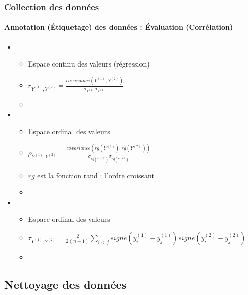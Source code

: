 \documentclass[xcolor=table]{beamer}
\begin{document}
\begin{frame}
	\frametitle{Collection des données}
	\framesubtitle{Annotation (Étiquetage) des données : Évaluation (Corrélation)}
	
	\begin{itemize}
		\item {}
		\begin{itemize}
			\item Espace continu des valeurs (régression)
			\item $r_{Y^{(1)},Y^{(2)}} = \frac{covariance(Y^{(1)},Y^{(2)})}{\sigma_{Y^{(1)}} \sigma_{Y^{(2)}}}$
			\item {}
		\end{itemize}
		\item {}
		\begin{itemize}
			\item Espace ordinal des valeurs
			\item $\rho_{Y^{(1)},Y^{(2)}} = \frac{covariance(rg(Y^{(1)}),rg(Y^{(2)}))}{\sigma_{rg(Y^{(1)})} \sigma_{rg(Y^{(2)})}}$
			\item $rg$ est la fonction rand ; l'ordre croissant
			\item {}
		\end{itemize}
		\item {}
		\begin{itemize}
			\item Espace ordinal des valeurs
			\item $\tau_{Y^{(1)},Y^{(2)}} = \frac{2}{2 (n-1)} \sum_{i<j} signe(y^{(1)}_i - y^{(1)}_j) signe(y^{(2)}_i - y^{(2)}_j)$
			\item {}
		\end{itemize}
	\end{itemize}
	
\end{frame}

\subsection{Nettoyage des données}
\end{document}

